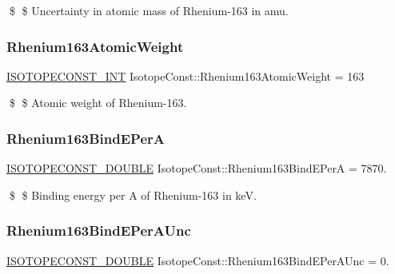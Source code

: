 \$ \$ Uncertainty in atomic mass of Rhenium-\/163 in amu. \mbox{\label{group___isotope_const-_rhenium-_re163_gaf8335fdc1af4f2ec60611fa8a2136bd5}} 
\subsubsection{\texorpdfstring{Rhenium163\+Atomic\+Weight}{Rhenium163AtomicWeight}}
{\footnotesize\ttfamily \mbox{\hyperlink{group___isotope_const-_macros_ga5f18360b3e99483a35c32d789e62621c}{I\+S\+O\+T\+O\+P\+E\+C\+O\+N\+S\+T\+\_\+\+I\+NT}} Isotope\+Const\+::\+Rhenium163\+Atomic\+Weight = 163}

\$ \$ Atomic weight of Rhenium-\/163. \mbox{\label{group___isotope_const-_rhenium-_re163_ga2badf49bc9b32f5b0c0b6f8b46ec4535}} 
\subsubsection{\texorpdfstring{Rhenium163\+Bind\+E\+PerA}{Rhenium163BindEPerA}}
{\footnotesize\ttfamily \mbox{\hyperlink{group___isotope_const-_macros_ga8f45a7272ce02c0b4c65c44636ed719a}{I\+S\+O\+T\+O\+P\+E\+C\+O\+N\+S\+T\+\_\+\+D\+O\+U\+B\+LE}} Isotope\+Const\+::\+Rhenium163\+Bind\+E\+PerA = 7870.}

\$ \$ Binding energy per A of Rhenium-\/163 in keV. \mbox{\label{group___isotope_const-_rhenium-_re163_gaab3a46a4cdca972159575562044102a0}} 
\subsubsection{\texorpdfstring{Rhenium163\+Bind\+E\+Per\+A\+Unc}{Rhenium163BindEPerAUnc}}
{\footnotesize\ttfamily \mbox{\hyperlink{group___isotope_const-_macros_ga8f45a7272ce02c0b4c65c44636ed719a}{I\+S\+O\+T\+O\+P\+E\+C\+O\+N\+S\+T\+\_\+\+D\+O\+U\+B\+LE}} Isotope\+Const\+::\+Rhenium163\+Bind\+E\+Per\+A\+Unc = 0.}

